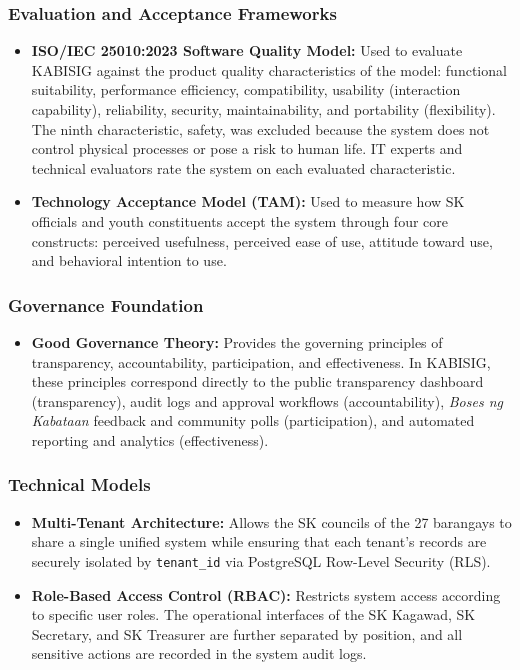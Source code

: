 \subsubsection{Evaluation and Acceptance Frameworks}
\begin{itemize}
    \item \textbf{ISO/IEC 25010:2023 Software Quality Model:} Used to evaluate KABISIG against the product quality characteristics of the model: functional suitability, performance efficiency, compatibility, usability (interaction capability), reliability, security, maintainability, and portability (flexibility). The ninth characteristic, safety, was excluded because the system does not control physical processes or pose a risk to human life. IT experts and technical evaluators rate the system on each evaluated characteristic.
    \item \textbf{Technology Acceptance Model (TAM):} Used to measure how SK officials and youth constituents accept the system through four core constructs: perceived usefulness, perceived ease of use, attitude toward use, and behavioral intention to use.
\end{itemize}

\subsubsection{Governance Foundation}
\begin{itemize}
    \item \textbf{Good Governance Theory:} Provides the governing principles of transparency, accountability, participation, and effectiveness. In KABISIG, these principles correspond directly to the public transparency dashboard (transparency), audit logs and approval workflows (accountability), \textit{Boses ng Kabataan} feedback and community polls (participation), and automated reporting and analytics (effectiveness).
\end{itemize}

\subsubsection{Technical Models}
\begin{itemize}
    \item \textbf{Multi-Tenant Architecture:} Allows the SK councils of the 27 barangays to share a single unified system while ensuring that each tenant's records are securely isolated by \texttt{tenant\_id} via PostgreSQL Row-Level Security (RLS).
    \item \textbf{Role-Based Access Control (RBAC):} Restricts system access according to specific user roles. The operational interfaces of the SK Kagawad, SK Secretary, and SK Treasurer are further separated by position, and all sensitive actions are recorded in the system audit logs.
\end{itemize}
\vspace{5mm}
\newpage

